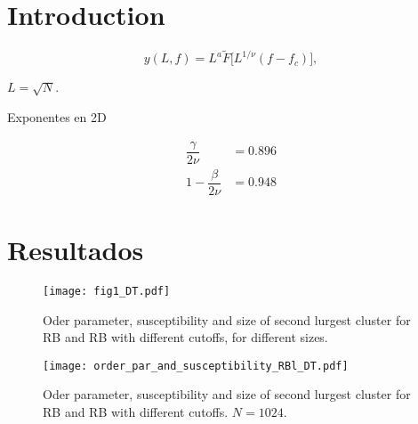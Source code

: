 \documentclass{article}
\begin{document}
\section{Introduction}

\begin{equation}
y(L, f) = L^{a} \tilde{F}\bigg[L^{1/\nu} (f-f_c)\bigg],
\end{equation}

$L = \sqrt{N}$.

Exponentes en 2D

\begin{align}
\dfrac{\gamma}{2\nu} &= 0.896 \\
1-\dfrac{\beta}{2\nu} &= 0.948
\end{align}

\section{Resultados}



\begin{figure}
\centering
\texttt{[image: fig1\_DT.pdf]}
\caption{Oder parameter, susceptibility and size of second lurgest cluster for RB and RB with different cutoffs, for different sizes.}
\end{figure}

\begin{figure}
\centering
\texttt{[image: order\_par\_and\_susceptibility\_RBl\_DT.pdf]}
\caption{Oder parameter, susceptibility and size of second lurgest cluster for RB and RB with different cutoffs. $N = 1024$.}
\end{figure}

\end{document}
